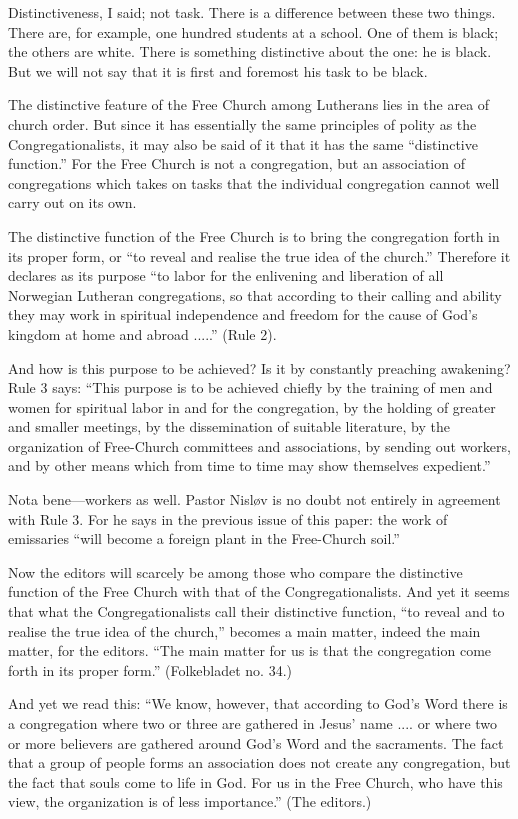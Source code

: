 Distinctiveness, I said; not task. There is a difference between these two things. There are, for example, one hundred students at a school. One of them is black; the others are white. There is something distinctive about the one: he is black. But we will not say that it is first and foremost his task to be black.

The distinctive feature of the Free Church among Lutherans lies in the area of church order. But since it has essentially the same principles of polity as the Congregationalists, it may also be said of it that it has the same “distinctive function.” For the Free Church is not a congregation, but an association of congregations which takes on tasks that the individual congregation cannot well carry out on its own.

The distinctive function of the Free Church is to bring the congregation forth in its proper form, or “to reveal and realise the true idea of the church.” Therefore it declares as its purpose “to labor for the enlivening and liberation of all Norwegian Lutheran congregations, so that according to their calling and ability they may work in spiritual independence and freedom for the cause of God’s kingdom at home and abroad .....” (Rule 2).

And how is this purpose to be achieved? Is it by constantly preaching awakening? Rule 3 says: “This purpose is to be achieved chiefly by the training of men and women for spiritual labor in and for the congregation, by the holding of greater and smaller meetings, by the dissemination of suitable literature, by the organization of Free-Church committees and associations, by sending out workers, and by other means which from time to time may show themselves expedient.”

Nota bene—workers as well. Pastor Nisløv is no doubt not entirely in agreement with Rule 3. For he says in the previous issue of this paper: the work of emissaries “will become a foreign plant in the Free-Church soil.”

Now the editors will scarcely be among those who compare the distinctive function of the Free Church with that of the Congregationalists. And yet it seems that what the Congregationalists call their distinctive function, “to reveal and to realise the true idea of the church,” becomes a main matter, indeed the main matter, for the editors. “The main matter for us is that the congregation come forth in its proper form.” (Folkebladet no. 34.)

And yet we read this: “We know, however, that according to God’s Word there is a congregation where two or three are gathered in Jesus’ name .... or where two or more believers are gathered around God’s Word and the sacraments. The fact that a group of people forms an association does not create any congregation, but the fact that souls come to life in God. For us in the Free Church, who have this view, the organization is of less importance.” (The editors.)

